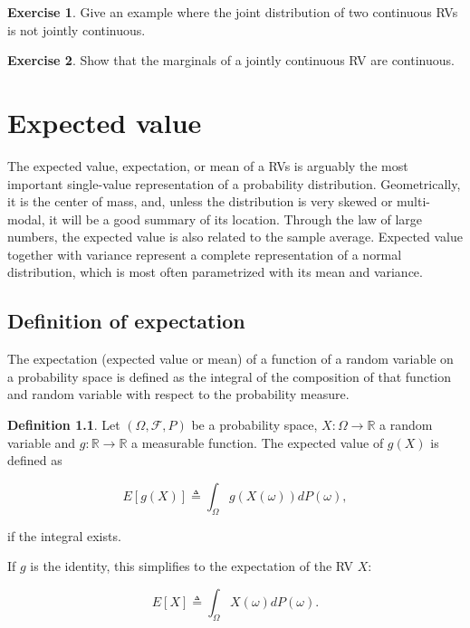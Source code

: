 \documentclass{book}
\theoremstyle{plain}%
\theoremstyle{definition}
\newtheorem{definition}{Definition}[section]
\newtheorem{exercise}{Exercise}[chapter]
\newlength{\arrow}
\begin{document}
\begin{exercise}
Give an example where the joint distribution of two continuous RVs is not jointly continuous.
\end{exercise}

\begin{exercise}
Show that the marginals of a jointly continuous RV are continuous.
\end{exercise}

\chapter{Expected value}

The expected value, expectation, or mean of a RVs is arguably the most important single-value representation of a probability distribution. Geometrically, it is the center of mass, and, unless the distribution is very skewed or multi-modal, it will be a good summary of its location. Through the law of large numbers, the expected value is also related to the sample average. Expected value together with variance represent a complete representation of a normal distribution, which is most often parametrized with its mean and variance.

\section{Definition of expectation}

The expectation (expected value or mean) of a function of a random variable on a probability space is defined as the integral of the composition of that function and random variable with respect to the probability measure.

\begin{definition}
Let $(\Omega, \mathcal{F}, P)$ be a probability space, $X: \Omega \rightarrow \mathbb{R}$ a random variable and $g: \mathbb{R} \rightarrow \mathbb{R}$ a measurable function. The expected value of $g(X)$ is defined as

$$E[g(X)] \triangleq \int_{\Omega} g(X(\omega))dP(\omega),$$

if the integral exists.

If $g$ is the identity, this simplifies to the expectation of the RV $X$:

$$E[X] \triangleq \int_{\Omega} X(\omega)dP(\omega).$$
\end{definition}
\end{document}
